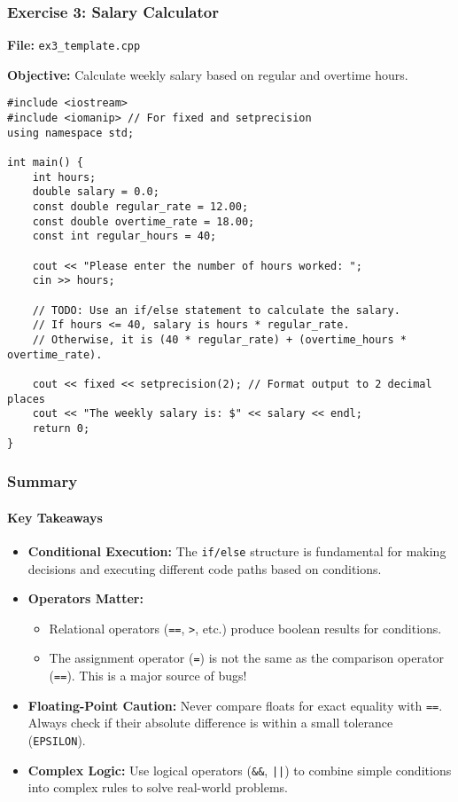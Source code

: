 \documentclass{beamer}
\begin{document}
\begin{frame}[fragile]
\frametitle{Exercise 3: Salary Calculator}
\textbf{File:} \texttt{ex3\_template.cpp}

\textbf{Objective:} Calculate weekly salary based on regular and overtime hours.

\begin{verbatim}
#include <iostream>
#include <iomanip> // For fixed and setprecision
using namespace std;

int main() {
    int hours;
    double salary = 0.0;
    const double regular_rate = 12.00;
    const double overtime_rate = 18.00;
    const int regular_hours = 40;

    cout << "Please enter the number of hours worked: ";
    cin >> hours;

    // TODO: Use an if/else statement to calculate the salary.
    // If hours <= 40, salary is hours * regular_rate.
    // Otherwise, it is (40 * regular_rate) + (overtime_hours * overtime_rate).

    cout << fixed << setprecision(2); // Format output to 2 decimal places
    cout << "The weekly salary is: $" << salary << endl;
    return 0;
}
\end{verbatim}
\end{frame}

\begin{frame}
\frametitle{Summary}
\framesubtitle{Key Takeaways}
\begin{itemize}
    \item \textbf{Conditional Execution:} The \texttt{if/else} structure is fundamental for making decisions and executing different code paths based on conditions.
    \item \textbf{Operators Matter:}
    \begin{itemize}
        \item Relational operators (\texttt{==}, \texttt{>}, etc.) produce boolean results for conditions.
        \item The assignment operator (\texttt{=}) is not the same as the comparison operator (\texttt{==}). This is a major source of bugs!
    \end{itemize}
    \item \textbf{Floating-Point Caution:} Never compare floats for exact equality with \texttt{==}. Always check if their absolute difference is within a small tolerance (\texttt{EPSILON}).
    \item \textbf{Complex Logic:} Use logical operators (\texttt{\&\&}, \texttt{||}) to combine simple conditions into complex rules to solve real-world problems.
\end{itemize}
\end{frame}
\end{document}
